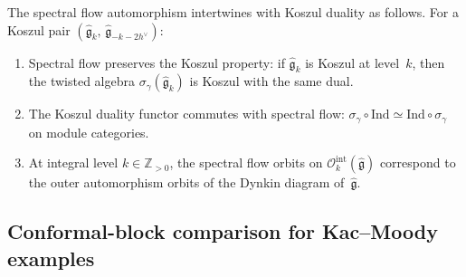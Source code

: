 \begin{proposition}
\label{prop:spectral-flow-koszul}
The spectral flow automorphism intertwines with Koszul duality as
follows. For a Koszul pair $(\widehat{\mathfrak{g}}_k,\,
\widehat{\mathfrak{g}}_{-k-2h^\vee})$:
\begin{enumerate}[label=(\roman*)]
\item Spectral flow preserves the Koszul property: if
 $\widehat{\mathfrak{g}}_k$ is Koszul at level~$k$, then the twisted
 algebra $\sigma_\gamma(\widehat{\mathfrak{g}}_k)$ is Koszul with the
 same dual.
\item The Koszul duality functor commutes with spectral flow:
 $\sigma_\gamma \circ \mathrm{Ind} \simeq \mathrm{Ind} \circ
 \sigma_\gamma$ on module categories.
\item At integral level $k \in \mathbb{Z}_{>0}$, the spectral flow
 orbits on $\mathcal{O}_k^{\mathrm{int}}(\widehat{\mathfrak{g}})$
 correspond to the outer automorphism orbits of the Dynkin diagram
 of~$\widehat{\mathfrak{g}}$.
\end{enumerate}
\end{proposition}

\subsection{Conformal-block comparison for Kac--Moody examples}
\label{sec:km-conformal-blocks}


